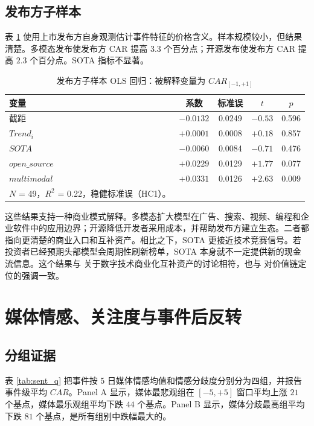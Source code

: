 \documentclass[11pt,fontset=fandol]{ctexart}
\begin{document}
\subsection{发布方子样本}

表 \ref{tab:pub_ols} 使用上市发布方自身观测估计事件特征的价格含义。样本规模较小，但结果清楚。多模态发布使发布方 CAR 提高 $3.3$ 个百分点；开源发布使发布方 CAR 提高 $2.3$ 个百分点。SOTA 指标不显著。

\begin{table}[htbp]
\centering
\caption{发布方子样本 OLS 回归：被解释变量为 $CAR_{[-1,+1]}$}
\label{tab:pub_ols}
\small
\begin{tabular}{lcccc}
\toprule
变量 & 系数 & 标准误 & $t$ & $p$ \\
\midrule
截距                 & $-0.0132$ & 0.0249 & $-0.53$ & 0.596 \\
$Trend_i$            & $+0.0001$ & 0.0008 & $+0.18$ & 0.857 \\
$SOTA$               & $-0.0060$ & 0.0084 & $-0.71$ & 0.476 \\
$open\_source$       & $+0.0229$ & 0.0129 & $+1.77$ & 0.077 \\
$multimodal$         & $+0.0331$ & 0.0126 & $+2.63$ & 0.009 \\
\midrule
$N$ = 49，$R^2$ = 0.22，稳健标准误（HC1）。 \\
\bottomrule
\end{tabular}
\end{table}

这些结果支持一种商业模式解释。多模态扩大模型在广告、搜索、视频、编程和企业软件中的应用边界；开源降低开发者采用成本，并帮助发布方建立生态。二者都指向更清楚的商业入口和互补资产。相比之下，SOTA 更接近技术竞赛信号。若投资者已经预期头部模型会周期性刷新榜单，SOTA 本身就不一定提供新的现金流信息。这个结果与 \citet{GoldfarbTucker2019} 关于数字技术商业化互补资产的讨论相符，也与 \citet{Porter1985} 对价值链定位的强调一致。

\section{媒体情感、关注度与事件后反转}
\label{sec:sentiment}

\subsection{分组证据}

表 \ref{tab:sent_q} 把事件按 5 日媒体情感均值和情感分歧度分别分为四组，并报告事件级平均 $CAR$。Panel A 显示，媒体最悲观组在 $[-5,+5]$ 窗口平均上涨 $21$ 个基点，媒体最乐观组平均下跌 $44$ 个基点。Panel B 显示，媒体分歧最高组平均下跌 $81$ 个基点，是所有组别中跌幅最大的。
\end{document}

